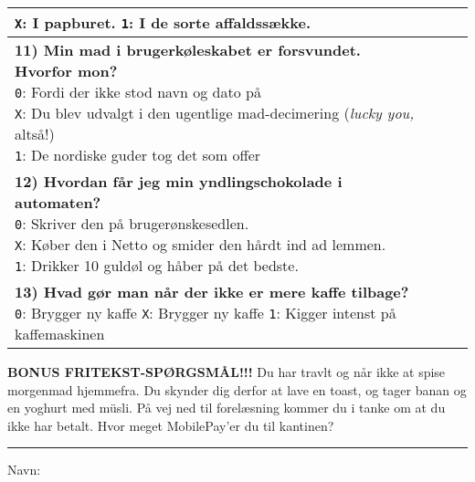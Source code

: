 \documentclass[a4paper]{article}
\begin{document}
\begin{center}
\begin{tabular}{|p{12cm}|p{0.2cm}|p{0.2cm}|p{0.2cm}|}
{  \texttt{X}: I papburet. \quad
  \texttt{1}: I de sorte affaldssække.
  \vspace{0.1cm}
} & & & \\\hline
\parbox{12cm}{
  \vspace{0.2cm}
  \textbf{11) Min mad i brugerkøleskabet er forsvundet. Hvorfor mon?}\\
  \texttt{0}: Fordi der ikke stod navn og dato på \quad \\
  \texttt{X}: Du blev udvalgt i den ugentlige mad-decimering (\textit{lucky you,} altså!) \quad \\
  \texttt{1}: De nordiske guder tog det som offer
  \vspace{0.1cm}
} & & & \\\hline
\parbox{12cm}{
  \vspace{0.2cm}
  \textbf{12) Hvordan får jeg min yndlingschokolade i automaten?} \\
  \texttt{0}: Skriver den på brugerønskesedlen. \\
  \texttt{X}: Køber den i Netto og smider den hårdt ind ad lemmen. \\
  \texttt{1}: Drikker 10 guldøl og håber på det bedste.
  \vspace{0.1cm}
} & & & \\\hline
\parbox{12cm}{
  \vspace{0.2cm}
  \textbf{13) Hvad gør man når der ikke er mere kaffe tilbage?}\\
  \texttt{0}:  Brygger ny kaffe \quad
  \texttt{X}:  Brygger ny kaffe \quad
  \texttt{1}:  Kigger intenst på kaffemaskinen
  \vspace{0.1cm}
} & & & \\\hline
\end{tabular}

\vspace{0.5cm}

{\textbf{BONUS FRITEKST-SPØRGSMÅL!!!} Du har travlt og når ikke at spise
  morgenmad hjemmefra. Du skynder dig derfor at lave en toast, og tager banan og
  en yoghurt med müsli. På vej ned til forelæsning kommer du i tanke om at du
  ikke har betalt. Hvor meget MobilePay'er du til kantinen?
\\ \vspace{0.5cm} \rule{5cm}{0.4pt}}

\vspace{0.5cm}
{\large Navn: \hrulefill}
\end{center}
\end{document}
